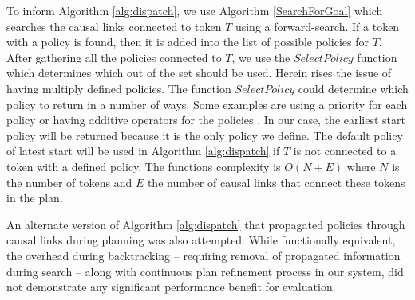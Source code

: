 
To inform Algorithm \ref{alg:dispatch}, we use Algorithm
\ref{SearchForGoal} which searches the causal links connected to token
$T$ using a forward-search.  If a token with a policy is found, then
it is added into the list of possible policies for $T$.  After
gathering all the policies connected to $T$, we use the $SelectPolicy$
function which determines which out of the set should be used. Herein
rises the issue of having multiply defined policies.  The function
$SelectPolicy$ could determine which policy to return in a number of
ways. Some examples are using a priority for each policy or having
additive operators for the policies .  In our case, the
earliest start policy will be returned because it is the only policy
we define.  The default policy of latest start will be used in
Algorithm \ref{alg:dispatch} if $T$ is not connected to a token with a
defined policy. 
The functions  complexity is $O(N+E)$ where
$N$ is the number of tokens and $E$ the number of causal links that
connect these tokens in the plan. 

An alternate version of Algorithm \ref{alg:dispatch} that propagated
policies through causal links during planning was also
attempted. While functionally equivalent, the overhead during
backtracking -- requiring removal of propagated information during
search -- along with continuous plan refinement process in our system,
did not demonstrate any significant performance benefit for
evaluation.

